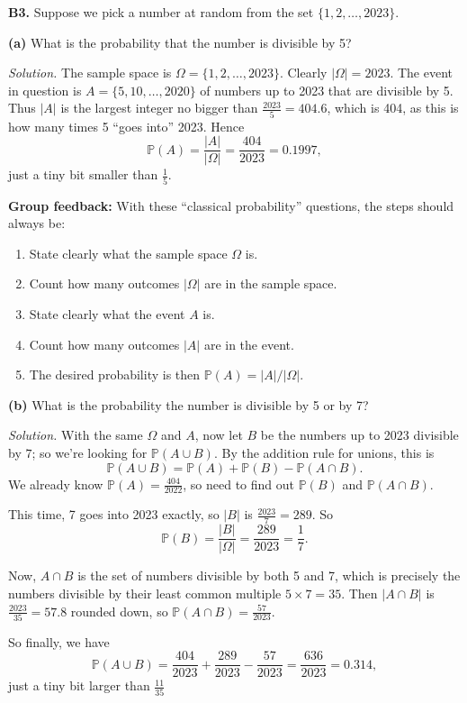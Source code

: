 \documentclass[
  a4paper,
]{book}
\providecommand{\tightlist}{%
  \setlength{\itemsep}{0pt}\setlength{\parskip}{0pt}}
\theoremstyle{definition}
\theoremstyle{definition}
\theoremstyle{definition}
\theoremstyle{definition}
\theoremstyle{remark}
\begin{document}
\textbf{B3.} Suppose we pick a number at random from the set \(\{1, 2, \dots, 2023\}\).

\textbf{(a)} What is the probability that the number is divisible by 5?

\begin{myanswers}

\emph{Solution.} The sample space is \(\Omega = \{1, 2, \dots, 2023\}\). Clearly \(|\Omega| = 2023\). The event in question is \(A = \{5, 10, \dots, 2020\}\) of numbers up to 2023 that are divisible by 5. Thus \(|A|\) is the largest integer no bigger than \(\frac{2023}{5} = 404.6\), which is 404, as this is how many times 5 ``goes into'' 2023. Hence
\[ \mathbb P(A) = \frac{|A|}{|\Omega|} = \frac{404}{2023} = 0.1997 , \]
just a tiny bit smaller than \(\frac{1}{5}\).

\textbf{Group feedback:} With these ``classical probability'' questions, the steps should always be:

\begin{enumerate}
\def\labelenumi{\arabic{enumi}.}
\tightlist
\item
  State clearly what the sample space \(\Omega\) is.
\item
  Count how many outcomes \(|\Omega|\) are in the sample space.
\item
  State clearly what the event \(A\) is.
\item
  Count how many outcomes \(|A|\) are in the event.
\item
  The desired probability is then \(\mathbb P(A) = |A|/|\Omega|\).
\end{enumerate}

\end{myanswers}

\textbf{(b)} What is the probability the number is divisible by 5 or by 7?

\begin{myanswers}
\emph{Solution.} With the same \(\Omega\) and \(A\), now let \(B\) be the numbers up to 2023 divisible by \(7\); so we're looking for \(\mathbb P(A \cup B)\). By the addition rule for unions, this is
\[ \mathbb P(A \cup B) = \mathbb P(A) + \mathbb P(B) - \mathbb P(A \cap B) . \]
We already know \(\mathbb P(A) = \frac{404}{2022}\), so need to find out \(\mathbb P(B)\) and \(\mathbb P(A \cap B)\).

This time, 7 goes into 2023 exactly, so \(|B|\) is \(\frac{2023}{7} = 289\). So
\[ \mathbb P(B) = \frac{|B|}{|\Omega|} = \frac{289}{2023} = \frac{1}{7}  . \]

Now, \(A \cap B\) is the set of numbers divisible by both 5 and 7, which is precisely the numbers divisible by their least common multiple \(5 \times 7 = 35\). Then \(|A \cap B|\) is \(\frac{2023}{35} = 57.8\) rounded down, so \(\mathbb P(A \cap B) = \frac{57}{2023}\).

So finally, we have
\[ \mathbb P(A \cup B) = \frac{404}{2023} + \frac{289}{2023} - \frac{57}{2023} = \frac{636}{2023} = 0.314 , \]
just a tiny bit larger than \(\frac{11}{35}\)

\end{myanswers}
\end{document}
